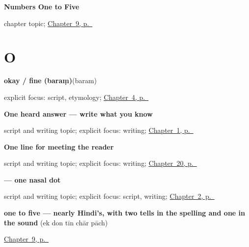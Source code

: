 \noindent\begin{minipage}[t]{\linewidth}
\raggedright
\textbf{Numbers One to Five}\par
\footnotesize chapter topic; \hyperref[ch:numbers-one-to-five]{Chapter~9, p.~\pageref*{ch:numbers-one-to-five}}
\end{minipage}\par\smallskip

\section*{O}

\noindent\begin{minipage}[t]{\linewidth}
\raggedright
\textbf{okay / fine (baraṃ)}\enspace\emph{}\enspace(baram)\par
\footnotesize explicit focus: script, etymology; \hyperref[ch:greetings]{Chapter~4, p.~\pageref*{ch:greetings}}
\end{minipage}\par\smallskip

\noindent\begin{minipage}[t]{\linewidth}
\raggedright
\textbf{One heard answer — write what you know}\par
\footnotesize script and writing topic; explicit focus: writing; \hyperref[ch:first-greeting-script]{Chapter~1, p.~\pageref*{ch:first-greeting-script}}
\end{minipage}\par\smallskip

\noindent\begin{minipage}[t]{\linewidth}
\raggedright
\textbf{One line for meeting the reader}\par
\footnotesize script and writing topic; explicit focus: writing; \hyperref[ch:mr-a1-named-reader-message]{Chapter~20, p.~\pageref*{ch:mr-a1-named-reader-message}}
\end{minipage}\par\smallskip

\noindent\begin{minipage}[t]{\linewidth}
\raggedright
\textbf{ — one nasal dot}\par
\footnotesize script and writing topic; explicit focus: script, writing; \hyperref[ch:thanks-script-a]{Chapter~2, p.~\pageref*{ch:thanks-script-a}}
\end{minipage}\par\smallskip

\noindent\begin{minipage}[t]{\linewidth}
\raggedright
\textbf{one to five — nearly Hindi's, with two tells in the spelling and one in the sound}\enspace\emph{    }\enspace(ek don tīn chār pāch)\par
\footnotesize \hyperref[ch:numbers-one-to-five]{Chapter~9, p.~\pageref*{ch:numbers-one-to-five}}
\end{minipage}\par\smallskip

